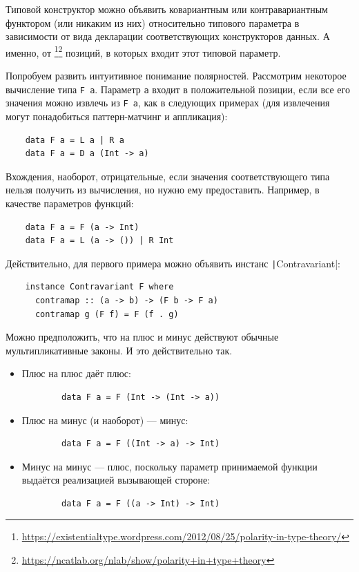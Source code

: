 Типовой конструктор можно объявить ковариантным или контравариантным функтором (или никаким из них) относительно типового параметра в зависимости от вида декларации соответствующих конструкторов данных.
А именно, от \footnote{\url{https://existentialtype.wordpress.com/2012/08/25/polarity-in-type-theory/}}\footnote{\url{https://ncatlab.org/nlab/show/polarity+in+type+theory}} позиций, в которых входит этот типовой параметр.

Попробуем развить интуитивное понимание полярностей.
Рассмотрим некоторое вычисление типа \texttt{F a}.
Параметр \texttt{a} входит в положительной позиции, если все его значения можно извлечь из \texttt{F a}, как в следующих примерах (для извлечения могут понадобиться паттерн-матчинг и аппликация):
\begin{verbatim}
    data F a = L a | R a
    data F a = D a (Int -> a)
\end{verbatim}

Вхождения, наоборот, отрицательные, если значения соответствующего типа нельзя получить из вычисления, но нужно ему предоставить.
Например, в качестве параметров функций:
\begin{verbatim}
    data F a = F (a -> Int)
    data F a = L (a -> ()) | R Int
\end{verbatim}
Действительно, для первого примера можно объявить инстанс \texttt|Contravariant|:
\begin{verbatim}
    instance Contravariant F where
      contramap :: (a -> b) -> (F b -> F a)
      contramap g (F f) = F (f . g)
\end{verbatim}

Можно предположить, что на плюс и минус действуют обычные мультипликативные законы.
И это действительно так.
\begin{itemize}
    \item Плюс на плюс даёт плюс:
    \begin{verbatim}
        data F a = F (Int -> (Int -> a))
    \end{verbatim}
    \item Плюс на минус (и наоборот) --- минус:
    \begin{verbatim}
        data F a = F ((Int -> a) -> Int)
    \end{verbatim}
    \item Минус на минус --- плюс, поскольку параметр принимаемой функции выдаётся реализацией вызывающей стороне:
    \begin{verbatim}
        data F a = F ((a -> Int) -> Int)
    \end{verbatim}
\end{itemize}

